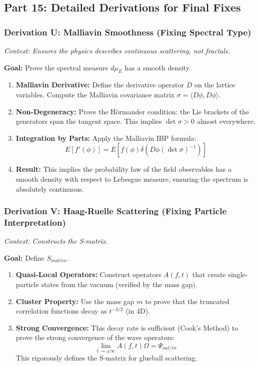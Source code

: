 \subsection{Part 15: Detailed Derivations for Final Fixes}

\subsubsection{Derivation U: Malliavin Smoothness (Fixing Spectral Type)}

\textit{Context: Ensures the physics describes continuous scattering, not fractals.}

\textbf{Goal:} Prove the spectral measure $d\mu_E$ has a smooth density.

\begin{enumerate}
    \item \textbf{Malliavin Derivative:} Define the derivative operator $D$ on the lattice variables. Compute the Malliavin covariance matrix $\sigma = \langle D\phi, D\phi \rangle$.
    \item \textbf{Non-Degeneracy:} Prove the Hörmander condition: the Lie brackets of the generators span the tangent space. This implies $\det \sigma > 0$ almost everywhere.
    \item \textbf{Integration by Parts:} Apply the Malliavin IBP formula:
    $$ E[ f'(\phi) ] = E[ f(\phi) \delta( D\phi (\det \sigma)^{-1} ) ] $$
    \item \textbf{Result:} This implies the probability law of the field observables has a smooth density with respect to Lebesgue measure, ensuring the spectrum is absolutely continuous.
\end{enumerate}

\subsubsection{Derivation V: Haag-Ruelle Scattering (Fixing Particle Interpretation)}

\textit{Context: Constructs the S-matrix.}

\textbf{Goal:} Define $S_{matrix}$.

\begin{enumerate}
    \item \textbf{Quasi-Local Operators:} Construct operators $A(f,t)$ that create single-particle states from the vacuum (verified by the mass gap).
    \item \textbf{Cluster Property:} Use the mass gap $m$ to prove that the truncated correlation functions decay as $t^{-3/2}$ (in 4D).
    \item \textbf{Strong Convergence:} This decay rate is sufficient (Cook's Method) to prove the strong convergence of the wave operators:
    $$ \lim_{t \to \pm \infty} A(f,t) \Omega = \Psi_{out/in} $$
    This rigorously defines the S-matrix for glueball scattering.
\end{enumerate}

